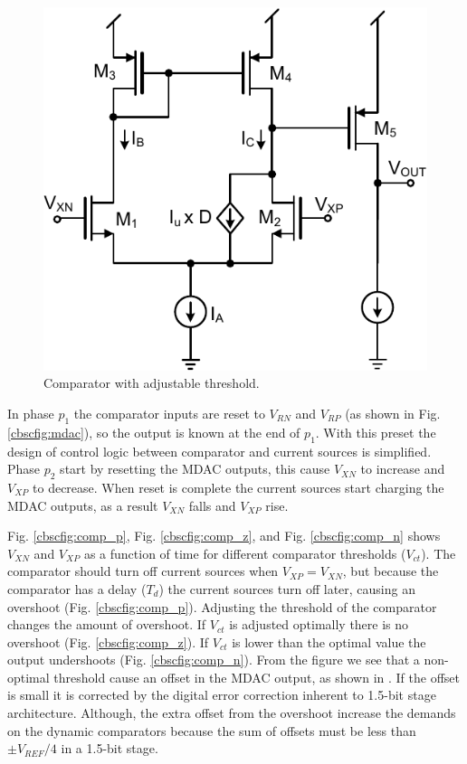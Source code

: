 \begin{figure}[htbp]
\centerline{ \includegraphics[width=\myfigwidthb]{graphics/comp}}
  \caption{Comparator with adjustable threshold.}
  \label{cbscfig:comp}
\end{figure}

In phase $p_1$ the comparator inputs
are reset to $V_{RN}$ and $V_{RP}$ (as shown in
Fig. \ref{cbscfig:mdac}), so the output is known at the end of $p_1$.
With this
preset the design of control logic between comparator and current sources
is simplified. Phase $p_2$ start by resetting the MDAC outputs,
this cause $V_{XN}$ to increase and $V_{XP}$ to decrease. When reset
is complete the current sources start charging the MDAC outputs, as a result
$V_{XN}$ falls and $V_{XP}$ rise. 

Fig. \ref{cbscfig:comp_p}, Fig. \ref{cbscfig:comp_z}, and
Fig. \ref{cbscfig:comp_n} 
shows
$V_{XN}$ and $V_{XP}$ as a function of time for different comparator
thresholds ($V_{ct}$). 
 The comparator should turn off current
sources when $V_{XP} = V_{XN}$, but because the
comparator has a delay
($T_d$) the current sources  turn off later, causing an overshoot  (Fig. \ref{cbscfig:comp_p}).
Adjusting the threshold of the 
comparator  changes the amount of overshoot. If $V_{ct}$
is adjusted optimally there is no overshoot  (Fig. \ref{cbscfig:comp_z}).
If $V_{ct}$ is lower than the optimal value the 
output undershoots (Fig. \ref{cbscfig:comp_n}). From the figure we see
that a non-optimal threshold cause an offset in the MDAC output, as
shown in . If the offset is small it is corrected by the
digital error correction inherent to 1.5-bit stage architecture. Although, the
extra offset from the overshoot increase the demands on the dynamic
comparators because the sum of offsets must be less than $\pm
V_{REF}/4$ in a 1.5-bit stage.

